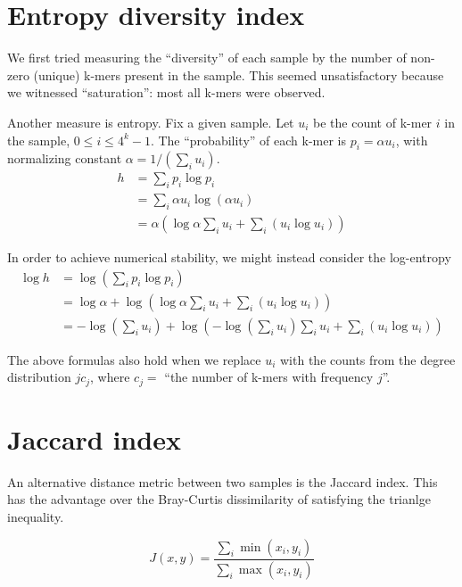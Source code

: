 \documentclass[10pt,letterpaper]{article}
\begin{document}

\section{Entropy diversity index}

We first tried measuring the “diversity” of each sample by the number of non-zero (unique) k-mers present in the sample.  This seemed unsatisfactory because we witnessed ``saturation'': most all k-mers were observed.

Another measure is entropy.
Fix a given sample.
Let $u_i$ be the count of k-mer $i$ in the sample, $0 \leq i \leq 4^k-1$.
The ``probability'' of each k-mer is $p_i = \alpha u_i$, with normalizing constant $\alpha = 1/(\sum_i u_i)$.
\begin{align*}
h &= \sum_i p_i \log p_i \\
 &= \sum_i \alpha u_i \log (\alpha u_i) \\
 &= \alpha (\log \alpha \sum_i u_i + \sum_i (u_i \log u_i))
\end{align*}

In order to achieve numerical stability, we might instead consider the log-entropy
\begin{align*}
\log h &= \log( \sum_i p_i \log p_i) \\
 &= \log \alpha + \log(\log \alpha \sum_i u_i + \sum_i (u_i \log u_i)) \\
 &= -\log(\sum_i u_i) + \log(-\log(\sum_i u_i) \sum_i u_i + \sum_i (u_i \log u_i)) 
\end{align*}

The above formulas also hold when we replace $u_i$ with 
the counts from the degree distribution $j c_j$, where $c_j = $ ``the number of k-mers with frequency $j$''. 


\section{Jaccard index}
An alternative distance metric between two samples is the Jaccard index. This has the advantage over the Bray-Curtis dissimilarity of satisfying the trianlge inequality.

\[
J(x,y) = \dfrac{\sum_i \min(x_i,y_i)}{\sum_i \max(x_i,y_i)}
\]
\end{document}
